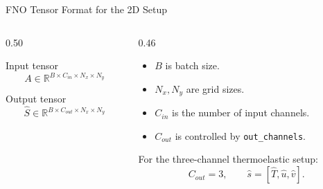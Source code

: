 \begin{frame}{FNO Tensor Format for the 2D Setup}
  \begin{columns}[T]
    \begin{column}{0.50\textwidth}
      \begin{block}{Input tensor}
        \[
          A\in\mathbb{R}^{B\times C_{in}\times N_x\times N_y}
        \]
      \end{block}
      \begin{block}{Output tensor}
        \[
          \hat{S}\in\mathbb{R}^{B\times C_{out}\times N_x\times N_y}
        \]
      \end{block}
    \end{column}
    \begin{column}{0.46\textwidth}
      \footnotesize
      \begin{itemize}
        \item $B$ is batch size.
        \item $N_x,N_y$ are grid sizes.
        \item $C_{in}$ is the number of input channels.
        \item $C_{out}$ is controlled by \texttt{out\_channels}.
      \end{itemize}
      \vskip 4pt
      For the three-channel thermoelastic setup:
      \[
        C_{out}=3,\qquad \hat{s}=[\hat{T},\hat{u},\hat{v}].
      \]
    \end{column}
  \end{columns}
\end{frame}

